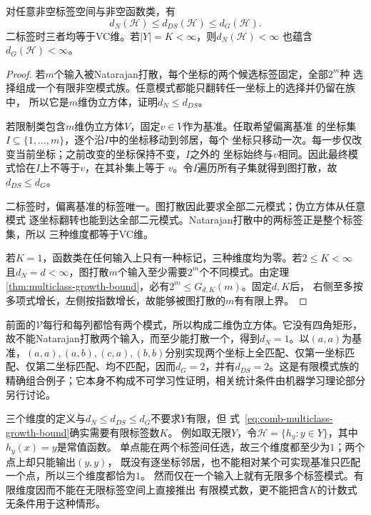 \begin{theorem}[多分类维度的比较]
\label{thm:multiclass-dimension-comparison}
对任意非空标签空间与非空函数类，有
\[
  d_N(\mathcal H)\leq d_{DS}(\mathcal H)\leq d_G(\mathcal H).
\]
二标签时三者均等于VC维。若\(|Y|=K<\infty\)，则\(d_N(\mathcal H)<\infty\)
也蕴含\(d_G(\mathcal H)<\infty\)。
\end{theorem}

\begin{proof}
若\(m\)个输入被Natarajan打散，每个坐标的两个候选标签固定，全部\(2^m\)种
选择组成一个有限非空模式族。任意模式都能只翻转任一坐标上的选择并仍留在族中，
所以它是\(m\)维伪立方体，证明\(d_N\leq d_{DS}\)。

若限制类包含\(m\)维伪立方体\(V\)，固定\(v\in V\)作为基准。任取希望偏离基准
的坐标集\(I\subseteq\{1,\ldots,m\}\)，逐个沿\(I\)中的坐标移动到邻居，每个
坐标只移动一次。每一步仅改变当前坐标；之前改变的坐标保持不变，\(I\)之外的
坐标始终与\(v\)相同。因此最终模式恰在\(I\)上不等于\(v\)，在其补集上等于
\(v\)。令\(I\)遍历所有子集就得到图打散，故\(d_{DS}\leq d_G\)。

二标签时，偏离基准的标签唯一。图打散因此要求全部二元模式；伪立方体从任意模式
逐坐标翻转也能到达全部二元模式。Natarajan打散中的两标签正是整个标签集，所以
三种维度都等于VC维。

若\(K=1\)，函数类在任何输入上只有一种标记，三种维度均为零。若\(2\leq K<\infty\)
且\(d_N=d<\infty\)，图打散\(m\)个输入至少需要\(2^m\)个不同模式。由定理~
\ref{thm:multiclass-growth-bound}，必有\(2^m\leq G_{d,K}(m)\)。固定\(d,K\)后，
右侧至多按多项式增长，左侧按指数增长，故能够被图打散的\(m\)有有限上界。
\end{proof}

前面的\(\mathcal V\)每行和每列都恰有两个模式，所以构成二维伪立方体。它没有四角矩形，故不能Natarajan打散两个输入，而至少能打散一个，得到\(d_N=1\)。以\((a,a)\)为基准，\((a,a),(a,b),(c,a),(b,b)\)分别实现两个坐标上全匹配、仅第一坐标匹配、仅第二坐标匹配、均不匹配，因而\(d_G=2\)，并有\(d_{DS}=2\)。这是有限模式族的精确组合例子；它本身不构成不可学习性证明，相关统计条件由机器学习理论部分另行讨论。

三个维度的定义与$d_N\leq d_{DS}\leq d_G$不要求$Y$有限，但
式~\eqref{eq:comb-multiclass-growth-bound}确实需要有限标签数$K$。
例如取无限$Y$，令$\mathcal H=\{h_y:y\in Y\}$，其中$h_y(x)=y$是常值函数。
单点能在两个标签间任选，故三个维度都至少为$1$；两个点上却只能输出$(y,y)$，
既没有逐坐标邻居，也不能相对某个可实现基准只匹配一个点，所以三个维度都恰为$1$。
然而仅在一个输入上就有无限多个标签模式。有限维度因而不能在无限标签空间上直接推出
有限模式数，更不能把含$K$的计数式无条件用于这种情形。

